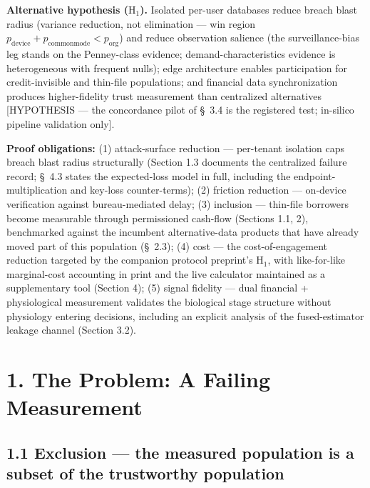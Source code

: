 \documentclass[
]{article}
\begin{document}
\textbf{Alternative hypothesis (\(\mathrm{H}_1\)).} Isolated per-user
databases reduce breach blast radius (variance reduction, not
elimination --- win region
\(p_{\mathrm{device}} + p_{\mathrm{commonmode}} < p_{\mathrm{org}}\))
and reduce observation salience (the surveillance-bias leg stands on the
Penney-class evidence; demand-characteristics evidence is heterogeneous
with frequent nulls); edge architecture enables participation for
credit-invisible and thin-file populations; and financial data
synchronization produces higher-fidelity trust measurement than
centralized alternatives {[}HYPOTHESIS --- the concordance pilot of
§~3.4 is the registered test; in-silico pipeline validation only{]}.

\textbf{Proof obligations:} (1) attack-surface reduction --- per-tenant
isolation caps breach blast radius structurally (Section 1.3 documents
the centralized failure record; §~4.3 states the expected-loss model in
full, including the endpoint-multiplication and key-loss counter-terms);
(2) friction reduction --- on-device verification against
bureau-mediated delay; (3) inclusion --- thin-file borrowers become
measurable through permissioned cash-flow (Sections 1.1, 2), benchmarked
against the incumbent alternative-data products that have already moved
part of this population (§~2.3); (4) cost --- the cost-of-engagement
reduction targeted by the companion protocol preprint's
\(\mathrm{H}_1\), with like-for-like marginal-cost accounting in print
and the live calculator maintained as a supplementary tool (Section 4);
(5) signal fidelity --- dual financial + physiological measurement
validates the biological stage structure without physiology entering
decisions, including an explicit analysis of the fused-estimator leakage
channel (Section 3.2).

\section{1. The Problem: A Failing
Measurement}\label{the-problem-a-failing-measurement}

\subsection{1.1 Exclusion --- the measured population is a subset of the
trustworthy
population}\label{exclusion-the-measured-population-is-a-subset-of-the-trustworthy-population}
\end{document}
